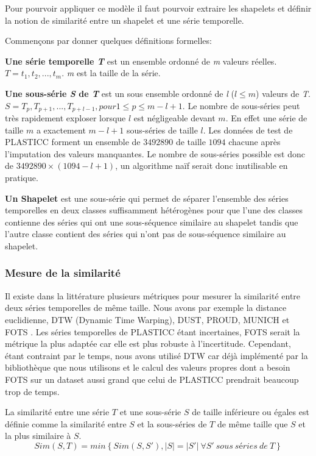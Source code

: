 Pour pourvoir appliquer ce modèle il faut pourvoir extraire les shapelets et définir la notion de similarité entre un shapelet et une série temporelle.

Commençons par donner quelques définitions formelles:

\textbf{Une série temporelle \textit{T}} est un ensemble ordonné de \textit{m} valeurs réelles. $ T = t_1, t_2,...,t_m $. \textit{m} est la taille de la série.

\textbf{Une sous-série \textit{S} de \textit{T}} est un sous ensemble ordonné de \textit{l} ($ l \leq m $) valeurs de \textit{T}. $ S = T_p, T_{p+1},..., T_{p+l-1}, pour 1 \leq p \leq m-l+1 $. Le nombre de sous-séries peut très rapidement exploser lorsque $l$ est négligeable devant $m$. En effet une série de taille $m$ a exactement $ m-l+1 $ sous-séries de taille $l$. Les données de test de PLASTICC forment un ensemble de $ 3492890 $ de taille $1094$ chacune après l'imputation des valeurs manquantes. Le nombre de sous-séries possible est donc de $ 3492890 \times (1094 - l + 1)$, un algorithme naïf serait donc inutilisable en pratique.

\textbf{Un Shapelet} est une sous-série qui permet de séparer l'ensemble des séries temporelles en deux classes suffisamment hétérogènes pour que l'une des classes contienne des séries qui ont une sous-séquence similaire au shapelet tandis que l'autre classe contient des séries qui n'ont pas de sous-séquence similaire au shapelet\cite{fotso2018frobenius}. 

\subsubsection{Mesure de la similarité}
Il existe dans la littérature plusieurs métriques pour mesurer la similarité entre deux séries temporelles de même taille. Nous avons par exemple la distance euclidienne, DTW (Dynamic Time Warping), DUST, PROUD, MUNICH et FOTS \cite{fotso2018frobenius}. Les séries temporelles de PLASTICC étant incertaines, FOTS serait la métrique la plus adaptée car elle est plus robuste à l'incertitude. Cependant, étant contraint par le temps, nous avons utilisé DTW car déjà implémenté par la bibliothèque que nous utilisons et le calcul des valeurs propres dont a besoin FOTS sur un dataset aussi grand que celui de PLASTICC prendrait beaucoup trop de temps.

La similarité entre une série $ T $ et une sous-série $ S $ de taille inférieure ou égales est définie comme la similarité entre $ S $ et la sous-séries de $ T $ de même taille que $ S $ et la plus similaire à $ S $. 
$$
Sim(S, T) = min \left \{ Sim(S, S'), |S|=|S'| \:  \forall S'\: sous \: séries \: de \: T \right \}
$$

